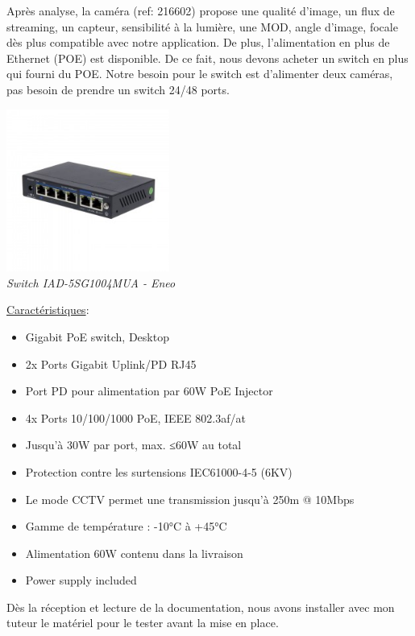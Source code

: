 \documentclass[12pt, french]{report}
\begin{document}
Après analyse, la caméra (ref: 216602) propose  une qualité d'image, un flux de streaming, un capteur, sensibilité à la lumière, une MOD, angle d'image, focale dès plus compatible avec notre application. De plus, l'alimentation en plus de Ethernet (POE) est disponible. De ce fait, nous devons acheter un switch en plus qui fourni du POE. Notre besoin pour le switch est d'alimenter deux caméras, pas besoin de prendre un switch 24/48 ports.

\begin{center}
    \includegraphics[width=0.4\textwidth]{Dimensionnement/SWPOE.jpg}\\
    \textit{Switch IAD-5SG1004MUA - Eneo}\\
\end{center}
\underline{Caractéristiques}:
\begin{itemize}
    \item[\bullet] Gigabit PoE switch, Desktop
    \item[\bullet] 2x Ports Gigabit Uplink/PD RJ45
    \item[\bullet] Port PD pour alimentation par 60W PoE Injector
    \item[\bullet] 4x Ports 10/100/1000 PoE, IEEE 802.3af/at
    \item[\bullet] Jusqu'à 30W par port, max. ≤60W au total
    \item[\bullet] Protection contre les surtensions IEC61000-4-5 (6KV)
    \item[\bullet] Le mode CCTV permet une transmission jusqu'à 250m @ 10Mbps
    \item[\bullet] Gamme de température : -10°C à +45°C
    \item[\bullet] Alimentation 60W contenu dans la livraison
    \item[\bullet] Power supply included\\ 
\end{itemize}
Dès la réception et lecture de la documentation, nous avons installer avec mon tuteur le matériel pour le tester avant la mise en place.
\end{document}

